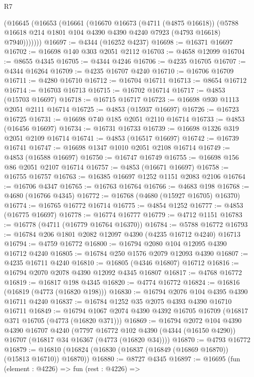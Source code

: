 \begin{lexlean}{R7}
\begin{coremodule}
        (@16645
          (@16653
            (@16661
              (@16670
                @16673
                (@4711 (@4875 @16618))
                (@5788 @16618 @214 @1801 @104 @4390 @4390 @4240 @7923 (@4793 @16618) @7940)))))))
@16697 := @4344 (@16252 @4237)
@16698 := @16371 @16697
@16702 := @16698 @140 @303 @2051 @2112
@16703 := @4658 @12099
@16704 := @8655 @4345
@16705 := @4344 @4246
@16706 := @4235 @16705
@16707 := @4344 @16264
@16709 := @4235 @16707 @4240
@16710 := @16706 @16709
@16711 := @4280 @16710
@16712 := @16704 @16711
@16713 := @8654 @16712
@16714 := @16703 @16713
@16715 := @16702 @16714
@16717 := @4853 (@15703 @16697)
@16718 := @16715 @16717
@16723 := @16698 @930 @1113 @2051 @2111 @16714
@16725 := @4853 (@15937 @16697)
@16726 := @16723 @16725
@16731 := @16698 @740 @185 @2051 @2110 @16714
@16733 := @4853 (@16456 @16697)
@16734 := @16731 @16733
@16739 := @16698 @1326 @319 @2051 @2109 @16714
@16741 := @4853 (@16517 @16697)
@16742 := @16739 @16741
@16747 := @16698 @1347 @1010 @2051 @2108 @16714
@16749 := @4853 (@16588 @16697)
@16750 := @16747 @16749
@16755 := @16698 @156 @86 @2051 @2107 @16714
@16757 := @4853 (@16671 @16697)
@16758 := @16755 @16757
@16763 := @16385 @16697 @1252 @1151 @2083 @2106
@16764 := @16706 @4347
@16765 := @16763 @16764
@16766 := @4683 @198
@16768 := @4680 (@16766 @4345)
@16772 := @16768 (@4680 (@15927 @16705) @16370)
@16774 := @16765 @16772 @16714
@16775 := @4854 @1252
@16777 := @4853 (@16775 @16697)
@16778 := @16774 @16777
@16779 := @4712 @1151
@16783 := @16778 (@4711 (@16779 @16764 @16370))
@16784 := @5788 @16772
@16793 := @16784 @206 @1801 @2082 @12097 @4390 (@4235 @16712 @4240) @16713
@16794 := @4759 @16772
@16800 := @16794 @2080 @104 @12095 @4390 @16712 @4240
@16805 := @16784 @250 @1576 @2079 @12093 @4390
@16807 := @4235 @16711 @4240
@16810 := @16805 (@4346 @16807) @16712
@16816 := @16794 @2070 @2078 @4390 @12092 @4345 @16807
@16817 := @4768 @16772
@16819 := @16817 @198 @4345
@16820 := @4774 @16772
@16824 := @16816 (@16819 (@4773 (@16820 @198)))
@16830 := @16794 @2076 @104 @4395 @4390 @16711 @4240
@16837 := @16784 @1252 @35 @2075 @4393 @4390 @16710 @16711
@16849 := @16794 @1067 @2074 @4390 @4392 @16705 @16709 (@16817 @371 @16705 (@4773 (@16820 @371)))
@16869 := @16794
    @2072
    @104
    @4390
    @4390
    @16707
    @4240
    (@7797 @16772 @102 @4390 (@4344 (@16150 @4290)) @16707 (@16817 @34 @16367 (@4773 (@16820 @34))))
@16870 := @4793 @16772
@16879 := @16810 (@16824 (@16830 (@16837 (@16849 (@16869 @16870)) (@15813 @16710)) @16870))
@16880 := @8727 @4345
@16897 := @16695
    (fun (element : @4226) =>
    fun (rest : @4226) =>

\end{coremodule}
\end{lexlean}
